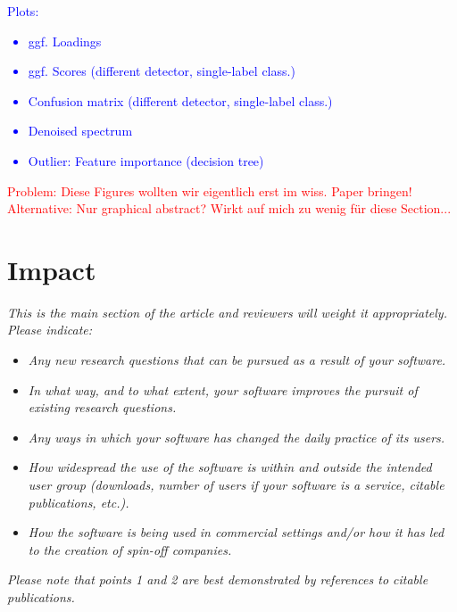 \documentclass[preprint,12pt, a4paper]{elsarticle}
\begin{document}
\textcolor{blue}{
Plots: 
\begin{itemize}
	\item ggf. Loadings
	\item ggf. Scores (different detector, single-label class.)
	\item Confusion matrix (different detector, single-label class.)
	\item Denoised spectrum
	\item Outlier: Feature importance (decision tree)
\end{itemize}}
\textcolor{red}{
Problem: Diese Figures wollten wir eigentlich erst im wiss. Paper bringen! 
Alternative: Nur graphical abstract? Wirkt auf mich zu wenig für diese Section...
}

\section{Impact}
\textit{This is the main section of the article and reviewers will weight it appropriately.
Please indicate:}
\begin{itemize}
    \item \textit{Any new research questions that can be pursued as a result of your software.}
    \item \textit{In what way, and to what extent, your software improves the pursuit of existing research questions.}
    \item \textit{Any ways in which your software has changed the daily practice of its users.}
    \item \textit{How widespread the use of the software is within and outside the intended user group (downloads, number of users if your software is a service, citable publications, etc.).}
    \item \textit{How the software is being used in commercial settings and/or how it has led to the creation of spin-off companies.}
    \end{itemize}
\textit{Please note that points 1 and 2 are best demonstrated by
  references to citable publications.}
\end{document}
